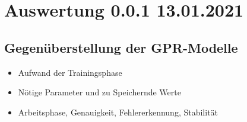 %

\chapter{Auswertung 0.0.1 13.01.2021}\label{ch:auswertung}

\section{Gegenüberstellung der GPR-Modelle}\label{sec:gegenueberstellung-gpr-modelle}
	\begin{itemize}
		\item Aufwand der Trainingsphase
		\item Nötige Parameter und zu Speichernde Werte
		\item Arbeitsphase, Genauigkeit, Fehlererkennung, Stabilität
	\end{itemize}